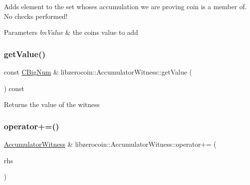 Adds element to the set whose\textquotesingle{}s accumulation we are proving coin is a member of. No checks performed!


\begin{DoxyParams}{Parameters}
{\em bn\+Value} & the coin\textquotesingle{}s value to add \\
\hline
\end{DoxyParams}
\mbox{\label{classlibzerocoin_1_1_accumulator_witness_af0afa4225f01cd21bdc8e88e310a0168}} 
\subsubsection{\texorpdfstring{getValue()}{getValue()}}
{\footnotesize\ttfamily const \mbox{\hyperlink{class_c_big_num}{C\+Big\+Num}} \& libzerocoin\+::\+Accumulator\+Witness\+::get\+Value (\begin{DoxyParamCaption}{ }\end{DoxyParamCaption}) const}

\begin{DoxyReturn}{Returns}
the value of the witness 
\end{DoxyReturn}
\mbox{\label{classlibzerocoin_1_1_accumulator_witness_a57de1414fbb80e5259a76e70b4baa28e}} 
\subsubsection{\texorpdfstring{operator+=()}{operator+=()}}
{\footnotesize\ttfamily \mbox{\hyperlink{classlibzerocoin_1_1_accumulator_witness}{Accumulator\+Witness}} \& libzerocoin\+::\+Accumulator\+Witness\+::operator+= (\begin{DoxyParamCaption}\item[{const \mbox{\hyperlink{classlibzerocoin_1_1_public_coin}{Public\+Coin}} \&}]{rhs }\end{DoxyParamCaption})}


